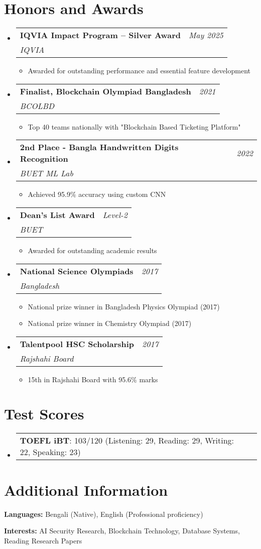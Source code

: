 \documentclass[a4paper,11pt]{article}
\makeatletter
\newcommand{\resumePOR}[3]{
\vspace{0.5mm}\item
    \begin{tabular*}{0.97\textwidth}[t]{l@{\extracolsep{\fill}}r}
        \textbf{#1}\hspace{0.3mm}#2 & \textit{\small{#3}} 
    \end{tabular*}
    \vspace{-2mm}
}
\newcommand{\resumeProject}[4]{
\vspace{0.5mm}\item
    \begin{tabular*}{0.98\textwidth}[t]{l@{\extracolsep{\fill}}r}
        \textbf{#1} & \textit{\footnotesize{#3}} \\
        \footnotesize{\textit{#2}} & \footnotesize{#4}
    \end{tabular*}
    \vspace{-2.4mm}
}
\newcommand{\resumeSubHeadingListStart}{\begin{itemize}[leftmargin=*,labelsep=1mm]}
\newcommand{\resumeItemListStart}{\begin{itemize}[leftmargin=*,labelsep=1mm,itemsep=0.5mm]}
\newcommand{\resumeSubHeadingListEnd}{\end{itemize}\vspace{2mm}}
\newcommand{\resumeItemListEnd}{\end{itemize}\vspace{-2mm}}
\makeatother
\begin{document}
\section{\textbf{Honors and Awards}}
\vspace{-0.4mm}
\resumeSubHeadingListStart

\resumeProject
  {IQVIA Impact Program – Silver Award}
  {IQVIA}
  {May 2025}
  {{}}
\resumeItemListStart
  \item Awarded for outstanding performance and essential feature development
\resumeItemListEnd

\resumeProject
  {Finalist, Blockchain Olympiad Bangladesh}
  {BCOLBD}
  {2021}
  {{}}
\resumeItemListStart
  \item Top 40 teams nationally with "Blockchain Based Ticketing Platform"
\resumeItemListEnd

\resumeProject
  {2nd Place - Bangla Handwritten Digits Recognition}
  {BUET ML Lab}
  {2022}
  {{}}
\resumeItemListStart
  \item Achieved 95.9\% accuracy using custom CNN
\resumeItemListEnd

\resumeProject
  {Dean's List Award}
  {BUET}
  {Level-2}
  {{}}
\resumeItemListStart
  \item Awarded for outstanding academic results
\resumeItemListEnd

\resumeProject
  {National Science Olympiads}
  {Bangladesh}
  {2017}
  {{}}
\resumeItemListStart
  \item National prize winner in Bangladesh Physics Olympiad (2017)
  \item National prize winner in Chemistry Olympiad (2017)
\resumeItemListEnd

\resumeProject
  {Talentpool HSC Scholarship}
  {Rajshahi Board}
  {2017}
  {{}}
\resumeItemListStart
  \item 15th in Rajshahi Board with 95.6\% marks
\resumeItemListEnd

\resumeSubHeadingListEnd

\vspace{-6mm}

\section{\textbf{Test Scores}}
\vspace{-0.4mm}
\resumeSubHeadingListStart
\resumePOR{TOEFL iBT}
    {: 103/120 (Listening: 29, Reading: 29, Writing: 22, Speaking: 23)}
    {}
\resumeSubHeadingListEnd
\vspace{-6mm}

\section{\textbf{Additional Information}}
\vspace{-0.4mm}
\small{
\textbf{Languages:} Bengali (Native), English (Professional proficiency)

\textbf{Interests:} AI Security Research, Blockchain Technology, Database Systems, Reading Research Papers
}
\vspace{-4mm}
\end{document}
